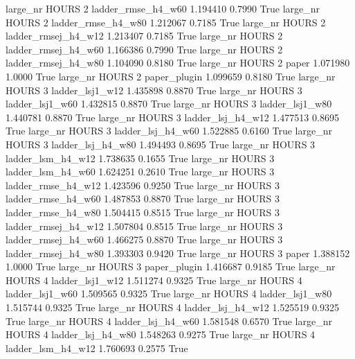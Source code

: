   large_nr    HOURS                 2  ladder_rmse_h4_w60   1.194410      0.7990    True
  large_nr    HOURS                 2  ladder_rmse_h4_w80   1.212067      0.7185    True
  large_nr    HOURS                 2 ladder_rmsej_h4_w12   1.213407      0.7185    True
  large_nr    HOURS                 2 ladder_rmsej_h4_w60   1.166386      0.7990    True
  large_nr    HOURS                 2 ladder_rmsej_h4_w80   1.104090      0.8180    True
  large_nr    HOURS                 2               paper   1.071980      1.0000    True
  large_nr    HOURS                 2        paper_plugin   1.099659      0.8180    True
  large_nr    HOURS                 3     ladder_lsj1_w12   1.435898      0.8870    True
  large_nr    HOURS                 3     ladder_lsj1_w60   1.432815      0.8870    True
  large_nr    HOURS                 3     ladder_lsj1_w80   1.440781      0.8870    True
  large_nr    HOURS                 3   ladder_lsj_h4_w12   1.477513      0.8695    True
  large_nr    HOURS                 3   ladder_lsj_h4_w60   1.522885      0.6160    True
  large_nr    HOURS                 3   ladder_lsj_h4_w80   1.494493      0.8695    True
  large_nr    HOURS                 3   ladder_lsm_h4_w12   1.738635      0.1655    True
  large_nr    HOURS                 3   ladder_lsm_h4_w60   1.624251      0.2610    True
  large_nr    HOURS                 3  ladder_rmse_h4_w12   1.423596      0.9250    True
  large_nr    HOURS                 3  ladder_rmse_h4_w60   1.487853      0.8870    True
  large_nr    HOURS                 3  ladder_rmse_h4_w80   1.504415      0.8515    True
  large_nr    HOURS                 3 ladder_rmsej_h4_w12   1.507804      0.8515    True
  large_nr    HOURS                 3 ladder_rmsej_h4_w60   1.466275      0.8870    True
  large_nr    HOURS                 3 ladder_rmsej_h4_w80   1.393303      0.9420    True
  large_nr    HOURS                 3               paper   1.388152      1.0000    True
  large_nr    HOURS                 3        paper_plugin   1.416687      0.9185    True
  large_nr    HOURS                 4     ladder_lsj1_w12   1.511274      0.9325    True
  large_nr    HOURS                 4     ladder_lsj1_w60   1.509565      0.9325    True
  large_nr    HOURS                 4     ladder_lsj1_w80   1.515744      0.9325    True
  large_nr    HOURS                 4   ladder_lsj_h4_w12   1.525519      0.9325    True
  large_nr    HOURS                 4   ladder_lsj_h4_w60   1.581548      0.6570    True
  large_nr    HOURS                 4   ladder_lsj_h4_w80   1.548263      0.9275    True
  large_nr    HOURS                 4   ladder_lsm_h4_w12   1.760693      0.2575    True
